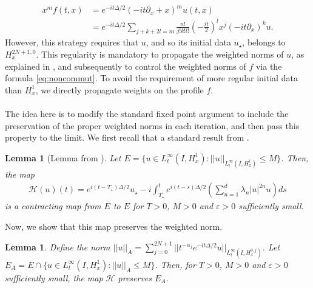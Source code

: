 \documentclass[a4paper, 15pt]{article}
\numberwithin{equation}{section}
\newtheorem{lem}[defi]{Lemma}
\begin{document}
\begin{align}
\label{eq:noncommut}
\nonumber x^mf(t,x)&=e^{-it\Delta/2}(-it\partial_x+x)^mu(t,x)\\
&=e^{-it\Delta/2}\sum_{j+k+2l=m}\frac{n!}{j!k!l!}(-\frac{it}{2})^lx^j(-it\partial_x)^ku.
\end{align}
However, this strategy requires that $u$, and so its initial data $u_\star$, belongs to $H^{2N+1,0}_x$. This regularity is mandatory to propagate the weighted norms of $u$, as explained in \cite{zbMATH04115164}, and subsequently to control the weighted norms of $f$ via the formula \ref{eq:noncommut}. To avoid the requirement of more regular initial data than $H^1_x$, we directly propagate weights on the profile $f$. \\\\
The idea here is to modify the standard fixed point argument to include the preservation of the proper weighted norms in each iteration, and then pass this property to the limit. We first recall that a standard result from \cite{zbMATH02001571}. \\
\begin{lem}[Lemma from \cite{zbMATH02001571}]
\label{lem:cazenave}
Let $E=\{u\in L^\infty_t(I,H^1_x):||u||_{L^\infty_t(I,H^1_x)}\leq M\}$. Then, the map 
\begin{align}
\label{eq:defmap}
\mathcal{H}(u)(t)=e^{i(t-T_\star)\Delta/2}u_\star-i\int^t_{T_\star}e^{i(t-s)\Delta/2}\left(\sum_{n=1}^{d}\lambda_n|u|^{2n}u\right)ds
\end{align}
is a contracting map from $E$ to $E$ for $T>0$, $M>0$ and $\varepsilon>0$ sufficiently small. 
\end{lem}
Now, we show that this map preserves the weighted norm.\\
\begin{lem}
\label{lem:preserve}
Define the norm $||u||_A=\sum^{2N+1}_{j=0}||t^{-\alpha_j}e^{-it\Delta/2}u||_{L^\infty_t(I,H^{0,j}_x)}$. Let $E_A=E\cap\{u\in L^\infty_t(I,H^1_x):||u||_A\leq M\}$. Then, for $T>0$, $M>0$ and $\varepsilon>0$ sufficiently small, the map 
$\mathcal{H}$ preserves $E_A$. 
\end{lem}
\end{document}
